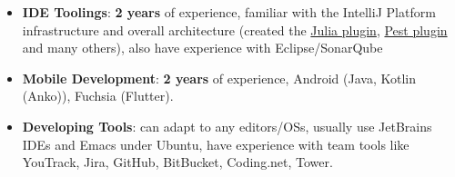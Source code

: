\documentclass{resume}
\begin{document}
\begin{itemize}[parsep=0.25ex]
  \item \textbf{IDE Toolings}:
    \textbf{2 years} of experience,
    familiar with the IntelliJ Platform infrastructure and overall
    architecture (created the
    \href{https://plugins.jetbrains.com/plugin/10413-julia}
         {Julia plugin},
    \href{https://plugins.jetbrains.com/plugin/12046-pest}
         {Pest plugin} and many others), also have experience with Eclipse/SonarQube

  \item \textbf{Mobile Development}:
    \textbf{2 years} of experience,
    Android (Java, Kotlin (Anko)), Fuchsia (Flutter).

  \item \textbf{Developing Tools}:
    can adapt to any editors/OSs, usually use JetBrains IDEs and Emacs under Ubuntu,
    have experience with team tools like YouTrack, Jira, GitHub, BitBucket, Coding.net, Tower.
\end{itemize}

\end{document}

